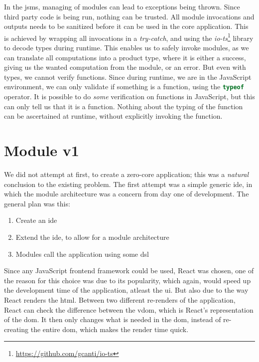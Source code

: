 In the \gls*{jsms}, managing of modules can lead to exceptions being thrown.
Since third party code is being run, nothing can be trusted. All module
invocations and outputs needs to be sanitized before it can be used in the core
application. This is achieved by wrapping all invocations in a
\textit{try-catch}, and using the \textit{io-ts}\footnote{\url{https://github.com/gcanti/io-ts}}
library to decode types during runtime. This enables us to safely invoke
modules, as we can translate all computations into a product type, where it is
either a success, giving us the wanted computation from the module, or an error.
But even with types, we cannot verify functions. Since during runtime, we are in
the JavaScript environment, we can only validate if something is a function,
using the \lstinline[language=JavaScript]{typeof} operator. It is possible to do
\textit{some} verification on functions in JavaScript, but this can only tell us
that it is a function. Nothing about the typing of the function can be
ascertained at runtime, without explicitly invoking the function.


\section{Module v1} \label{sec:mod1}

We did not attempt at first, to create a zero-core application; this was a
\textit{natural} conclusion to the existing problem. The first attempt was a
simple generic \gls*{ide}, in which the module architecture was a concern from
day one of development. The general plan was this:

\begin{enumerate}
  \item Create an \gls*{ide}
  \item Extend the \gls*{ide}, to allow for a module architecture
  \item Modules call the application using some \gls*{dsl}
\end{enumerate}

Since any JavaScript frontend framework could be used, React was chosen, one of
the reason for this choice was due to its popularity, which again, would speed
up the development time of the application, atleast the \gls*{ui}. But also due
to the way React renders the \gls*{html}. Between two different re-renders of
the application, React can check the difference between the \gls*{vdom}, which
is React's representation of the \gls*{dom}. It then only changes what is needed
in the \gls*{dom}, instead of re-creating the entire \gls*{dom}, which makes the
render time quick.

